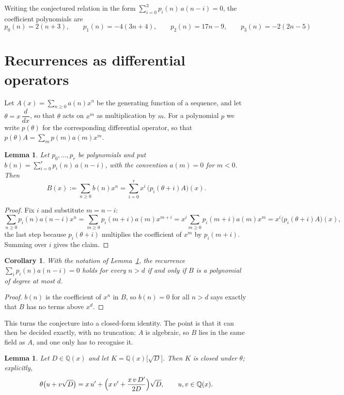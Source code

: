\documentclass[11pt,a4paper]{article}
\theoremstyle{plain}
\newtheorem{lemma}[theorem]{Lemma}
\newtheorem{corollary}[theorem]{Corollary}
\theoremstyle{definition}
\begin{document}
Writing the conjectured relation in the form $\sum_{i=0}^{3}p_{i}(n)\,a(n-i)=0$,
the coefficient polynomials are
\[
p_{0}(n)=2 \left(n + 3\right),\qquad p_{1}(n)=- 4 \left(3 n + 4\right),\qquad p_{2}(n)=17 n - 9,\qquad p_{3}(n)=- 2 \left(2 n - 5\right)
\]

\section{Recurrences as differential operators}

Let $A(x)=\sum_{n\ge0}a(n)x^{n}$ be the generating function of a sequence, and let
$\theta=x\,\dfrac{d}{dx}$, so that $\theta$ acts on $x^{m}$ as multiplication by $m$. For a
polynomial $p$ we write $p(\theta)$ for the corresponding differential operator, so that
$p(\theta)A=\sum_{m}p(m)a(m)x^{m}$.

\begin{lemma}\label{lem:transfer}
Let $p_{0},\dots,p_{r}$ be polynomials and put $b(n)=\sum_{i=0}^{r}p_{i}(n)\,a(n-i)$, with
the convention $a(m)=0$ for $m<0$. Then
\[
B(x):=\sum_{n\ge0}b(n)x^{n}=\sum_{i=0}^{r}x^{i}\,\bigl(p_{i}(\theta+i)A\bigr)(x).
\]
\end{lemma}

\begin{proof}
Fix $i$ and substitute $m=n-i$:
\[
\sum_{n\ge0}p_{i}(n)a(n-i)x^{n}=\sum_{m\ge0}p_{i}(m+i)a(m)x^{m+i}
=x^{i}\sum_{m\ge0}p_{i}(m+i)a(m)x^{m}=x^{i}\bigl(p_{i}(\theta+i)A\bigr)(x),
\]
the last step because $p_{i}(\theta+i)$ multiplies the coefficient of $x^{m}$ by
$p_{i}(m+i)$. Summing over $i$ gives the claim.
\end{proof}

\begin{corollary}\label{cor:criterion}
With the notation of Lemma~\ref{lem:transfer}, the recurrence
$\sum_{i}p_{i}(n)a(n-i)=0$ holds for every $n>d$ if and only if $B$ is a polynomial of
degree at most $d$.
\end{corollary}

\begin{proof}
$b(n)$ is the coefficient of $x^{n}$ in $B$, so $b(n)=0$ for all $n>d$ says exactly that
$B$ has no terms above $x^{d}$.
\end{proof}

This turns the conjecture into a closed-form identity. The point is that it can then be
decided exactly, with no truncation: $A$ is algebraic, so $B$ lies in the same field as
$A$, and one only has to recognise it.

\begin{lemma}\label{lem:field}
Let $D\in\mathbb{Q}(x)$ and let $K=\mathbb{Q}(x)\bigl[\sqrt{D}\bigr]$. Then $K$ is closed
under $\theta$; explicitly,
\[
\theta\bigl(u+v\sqrt{D}\bigr)=x\,u'+\Bigl(x\,v'+\frac{x\,v\,D'}{2D}\Bigr)\sqrt{D},
\qquad u,v\in\mathbb{Q}(x).
\]
\end{lemma}
\end{document}
